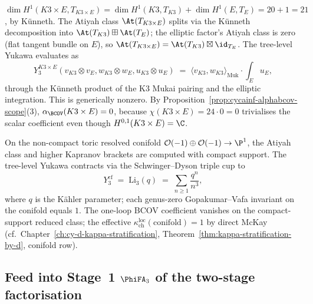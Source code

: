 \begin{example}[$K3 \times E$]
\label{ex:cycainf-k3e-three-cocycles}
$\dim H^1(K3 \times E, T_{K3 \times E}) = \dim H^1(K3, T_{K3}) +
\dim H^1(E, T_E) = 20 + 1 = 21$, by K\"unneth. The Atiyah class
$\At(T_{K3 \times E})$ splits via the K\"unneth decomposition into
$\At(T_{K3}) \boxplus \At(T_E)$; the elliptic factor's Atiyah class
is zero (flat tangent bundle on $E$), so $\At(T_{K3 \times E}) =
\At(T_{K3}) \boxtimes \id_{T_E}$. The tree-level Yukawa evaluates as
\[
 Y_3^{K3 \times E}(v_{K3} \otimes v_E, w_{K3} \otimes w_E,
 u_{K3} \otimes u_E) \;=\; \bigl\langle v_{K3}, w_{K3}
 \bigr\rangle_{\mathrm{Muk}} \cdot \int_E u_E,
\]
through the K\"unneth product of the K3 Mukai pairing and the elliptic
integration. This is generically nonzero. By
Proposition~\ref{prop:cycainf-alphabcov-scope}(3),
$\alpha_{\BCOV}(K3 \times E) = 0$, because $\chi(K3 \times E) =
24 \cdot 0 = 0$ trivialises the scalar coefficient even though
$H^{0,1}(K3 \times E) = \C$.
\end{example}

\begin{example}
\label{ex:cycainf-conifold-three-cocycles}
On the non-compact toric resolved conifold $\mathcal O(-1) \oplus
\mathcal O(-1) \to \P^1$, the Atiyah class and higher Kapranov brackets
are computed with compact support. The tree-level Yukawa contracts via
the Schwinger--Dyson triple cup to
\[
 Y_3^{\mathrm{cf}} \;=\; \mathrm{Li}_3(q) \;=\; \sum_{n \geq 1}
 \frac{q^n}{n^3},
\]
where $q$ is the K\"ahler parameter; each genus-zero Gopakumar--Vafa
invariant on the conifold equals $1$. The one-loop BCOV coefficient
vanishes on the compact-support reduced class; the effective
$\kappa_{\mathrm{ch}}^{\mathrm{loc}}(\mathrm{conifold}) = 1$ by direct McKay
(cf.\ Chapter~\ref{ch:cy-d-kappa-stratification},
Theorem~\ref{thm:kappa-stratification-by-d}, conifold row).
\end{example}

\subsection{Feed into Stage~1 \texorpdfstring{$\PhiFA_3$}{PhiFA3} of the two-stage factorisation}
\label{subsec:cycainf-stage-1-phifa3-feed}

